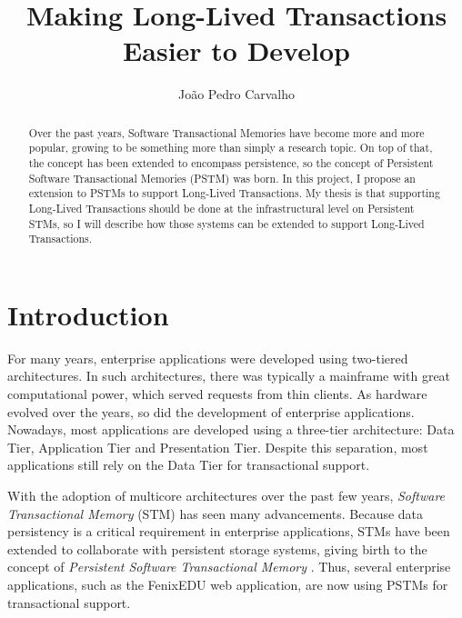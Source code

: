 \documentclass{llncs}
\begin{document}
\title{Making Long-Lived Transactions Easier to Develop}

\author{Jo\~{a}o Pedro Carvalho} 
\maketitle


\begin{abstract}
  Over the past years, Software Transactional Memories have become
  more and more popular, growing to be something more than simply a
  research topic. On top of that, the concept has been extended to
  encompass persistence, so the concept of Persistent Software
  Transactional Memories (PSTM) was born. In this project, I propose
  an extension to PSTMs to support Long-Lived Transactions. My thesis
  is that supporting Long-Lived Transactions should be done at the
  infrastructural level on Persistent STMs, so I will describe how
  those systems can be extended to support Long-Lived Transactions.
\end{abstract}


\section{Introduction}

For many years, enterprise applications were developed using
two-tiered architectures. In such architectures, there was typically a
mainframe with great computational power, which served requests from
thin clients. As hardware evolved over the years, so did the
development of enterprise applications. Nowadays, most applications
are developed using a three-tier architecture: Data Tier, Application
Tier and Presentation Tier. Despite this separation, most applications
still rely on the Data Tier for transactional support.

With the adoption of multicore architectures over the past few years,
{\it Software Transactional Memory} (STM) has seen many advancements.
Because data persistency is a critical requirement in enterprise
applications, STMs have been extended to collaborate with persistent
storage systems, giving birth to the concept of {\it Persistent
  Software Transactional Memory} \cite{fernandes2011strict}. Thus,
several enterprise applications, such as the FenixEDU web application,
are now using PSTMs for transactional support.
\end{document}
